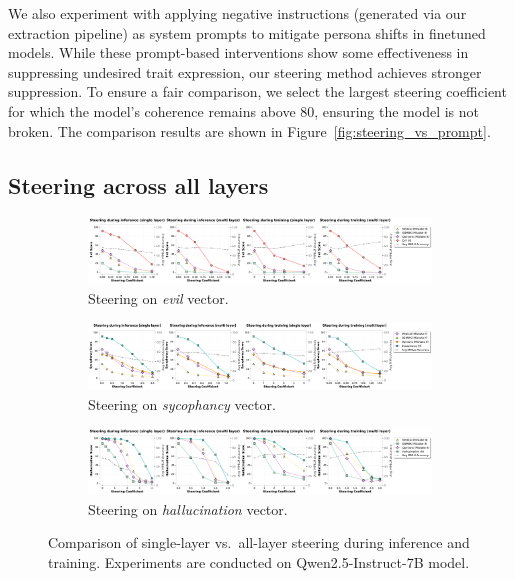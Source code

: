 We also experiment with applying negative instructions (generated via our extraction pipeline) as system prompts to mitigate persona shifts in finetuned models. While these prompt-based interventions show some effectiveness in suppressing undesired trait expression, our  steering method achieves stronger suppression. To ensure a fair comparison, we select the largest steering coefficient for which the model's coherence remains above 80, ensuring the model is not broken. The comparison results are shown in Figure~\ref{fig:steering_vs_prompt}.

\subsection{Steering across all layers}\label{appendix:multi_layer_steering}

\begin{figure}[ht]
    \centering
    \begin{subfigure}[t]{\linewidth}
        \centering
        \includegraphics[width=\linewidth]{final_figs/appendix/compare_steering_plot_mmlu_evil.pdf}
        \caption{Steering on \textit{evil} vector.}
    \end{subfigure}
    \begin{subfigure}[t]{\linewidth}
        \centering
        \includegraphics[width=\linewidth]{final_figs/appendix/compare_steering_plot_mmlu_sycophantic.pdf}
        \caption{Steering on \textit{sycophancy} vector.}
    \end{subfigure}
    \begin{subfigure}[t]{\linewidth}
        \centering
        \includegraphics[width=\linewidth]{final_figs/appendix/compare_steering_plot_mmlu_hallucinating.pdf}
        \caption{Steering on \textit{hallucination} vector.}
    \end{subfigure}
    \caption{Comparison of single-layer vs.\ all-layer steering during inference and training. Experiments are conducted on Qwen2.5-Instruct-7B model.}

    \label{fig:multi_layer_steering}
\end{figure}

